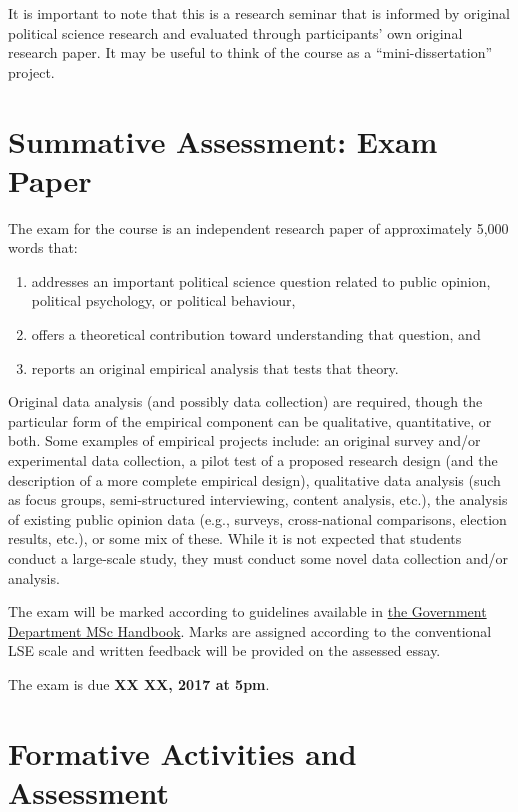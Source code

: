 \documentclass[12pt,a4paper]{article}
\begin{document}
\noindent It is important to note that this is a research seminar that is informed by original political science research and evaluated through participants' own original research paper. It may be useful to think of the course as a ``mini-dissertation'' project.

\section{Summative Assessment: Exam Paper}

The exam for the course is an independent research paper of approximately 5,000 words that:

\begin{enumerate}
\item addresses an important political science question related to public opinion, political psychology, or political behaviour,
\item offers a theoretical contribution toward understanding that question, and 
\item reports an original empirical analysis that tests that theory.
\end{enumerate}

Original data analysis (and possibly data collection) are required, though the particular form of the empirical component can be qualitative, quantitative, or both. Some examples of empirical projects include: an original survey and/or experimental data collection, a pilot test of a proposed research design (and the description of a more complete empirical design), qualitative data analysis (such as focus groups, semi-structured interviewing, content analysis, etc.), the analysis of existing public opinion data (e.g., surveys, cross-national comparisons, election results, etc.), or some mix of these. While it is not expected that students conduct a large-scale study, they must conduct some novel data collection and/or analysis.

The exam will be marked according to guidelines available in \href{http://www.lse.ac.uk/government/degreeProgrammes/programmes/masters/MSc-Handbook-2015-6.pdf}{the Government Department MSc Handbook}. Marks are assigned according to the conventional LSE scale and written feedback will be provided on the assessed essay.

\vspace{1em}

\noindent The exam is due \textbf{XX XX, 2017 at 5pm}.


\section{Formative Activities and Assessment}
\end{document}
